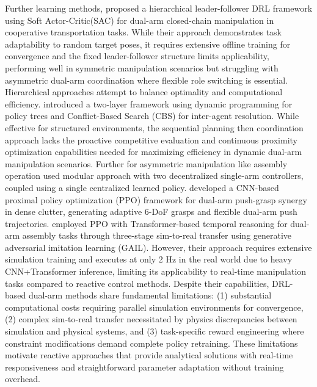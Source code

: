\documentclass[pdflatex,sn-mathphys-num]{sn-jnl}%
\theoremstyle{thmstyleone}%
\theoremstyle{thmstylethree}%
\begin{document}
Further learning methods, \cite{dual-arm, hao2024coordinated} proposed a hierarchical leader-follower DRL framework using Soft Actor-Critic(SAC) for dual-arm closed-chain manipulation in cooperative transportation tasks. While their approach demonstrates task adaptability to random target poses, it requires extensive offline training for convergence and the fixed leader-follower structure limits applicability, performing well in symmetric manipulation scenarios but struggling with asymmetric dual-arm coordination where flexible role switching is essential. Hierarchical approaches attempt to balance optimality and computational efficiency. \cite{intro6} introduced a two-layer framework using dynamic programming for policy trees and Conflict-Based Search (CBS) for inter-agent resolution. While effective for structured environments, the sequential planning then coordination approach lacks the proactive competitive evaluation and continuous proximity optimization capabilities needed for maximizing efficiency in dynamic dual-arm manipulation scenarios. Further for asymmetric manipulation like assembly operation \cite{alles2022learning} used modular approach with two decentralized single-arm controllers,  coupled using a single centralized learned policy. \cite{wang2025learning} developed a CNN-based proximal policy optimization (PPO) framework for dual-arm push-grasp synergy in dense clutter, generating adaptive 6-DoF grasps and flexible dual-arm push trajectories. \cite{jiang2023mastering} employed PPO with Transformer-based temporal reasoning for dual-arm assembly tasks through three-stage sim-to-real transfer using generative adversarial imitation learning (GAIL). However, their approach requires extensive simulation training and executes at only 2 Hz in the real world due to heavy CNN+Transformer inference, limiting its applicability to real-time manipulation tasks compared to reactive control methods. Despite their capabilities, 
DRL-based dual-arm methods share fundamental limitations: (1) substantial computational costs requiring parallel simulation 
environments for convergence, (2) complex sim-to-real transfer necessitated by physics discrepancies between simulation and physical 
systems, and (3) task-specific reward engineering where constraint modifications demand complete policy retraining. These limitations motivate reactive approaches that provide analytical solutions with real-time responsiveness and straightforward parameter adaptation without training overhead.
\end{document}

